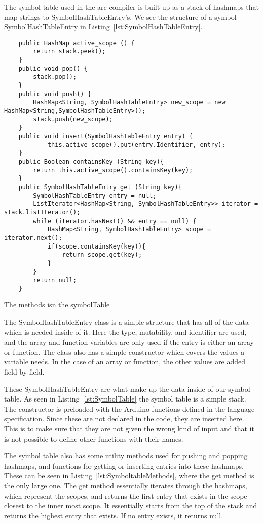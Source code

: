 The symbol table used in the arc compiler is built up as a stack of hashmaps that map strings to SymbolHashTableEntry's. We see the structure of a symbol SymbolHashTableEntry in Listing~\ref{lst:SymbolHashTableEntry}.


\begin{listing}[htb!]
    \begin{verbatim}
    public HashMap active_scope () {
        return stack.peek();
    }
    public void pop() {
        stack.pop();
    }
    public void push() {
        HashMap<String, SymbolHashTableEntry> new_scope = new HashMap<String,SymbolHashTableEntry>();
        stack.push(new_scope);
    }
    public void insert(SymbolHashTableEntry entry) {
            this.active_scope().put(entry.Identifier, entry);
    }
    public Boolean containsKey (String key){
        return this.active_scope().containsKey(key);
    }
    public SymbolHashTableEntry get (String key){
        SymbolHashTableEntry entry = null;
        ListIterator<HashMap<String, SymbolHashTableEntry>> iterator = stack.listIterator();
        while (iterator.hasNext() && entry == null) {
            HashMap<String, SymbolHashTableEntry> scope = iterator.next();
            if(scope.containsKey(key)){
                return scope.get(key);
            }
        }
        return null;   
    }
\end{verbatim}
    \caption{The methods isn the symbolTable}
    \label{lst:SymboltableMethods}
\end{listing}


The SymbolHashTableEntry class is a simple structure that has all of the data which is needed inside of it. Here the type, mutability, and identifier are used, and the array and function variables are only used if the entry is either an array or function. The class also has a simple constructor which covers the values a variable needs. In the case of an array or function, the other values are added field by field.



These SymbolHashTableEntry are what make up the data inside of our symbol table. As seen in Listing~\ref{lst:SymbolTable} the symbol table is a simple stack. The constructor is preloaded with the Arduino functions defined in the language specification. Since these are not declared in the code, they are inserted here. This is to make sure that they are not given the wrong kind of input and that it is not possible to define other functions with their names.





The symbol table also has some utility methods used for pushing and popping hashmaps, and functions for getting or inserting entries into these hashmaps. These can be seen in Listing~\ref{lst:SymboltableMethods}, where the get method is the only large one. The get method essentially iterates through the hashmaps, which represent the scopes, and returns the first entry that exists in the scope closest to the inner most scope. It essentially starts from the top of the stack and returns the highest entry that exists. If no entry exists, it returns null.


